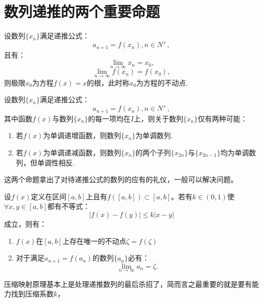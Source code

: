 \section{数列递推的两个重要命题}

\begin{proposition}[不动点的定义]
	设数列$\{x_n\}$满足递推公式：
	\begin{equation}
		a_{n+1}=f(x_n),n\in N^+,
	\end{equation}
	且有：
	\begin{equation}
		\displaystyle\lim_{n\to\infty}x_n=x_0,
	\end{equation}
	\begin{equation}
		\displaystyle\lim_{n\to\infty}f(x_n)=f(x_0),
	\end{equation}
	则极限$x_0$为方程$f(x)=x$的根，此时称$x_0$为方程的不动点.
\end{proposition}
	
	
\begin{proposition}[递推数列推出单调性]
	设数列$\{x_n\}$满足递推公式：
	\begin{equation}
		a_{n+1}=f(x_n),n\in N^+,
	\end{equation}
	其中函数$f(x)$与数列$\{x_n\}$的每一项均在$I$上，则关于数列$\{x_n\}$仅有两种可能：
	\begin{enumerate}
		\item 若$f(x)$为单调递增函数，则数列$\{x_n\}$为单调数列.
		\item 若$f(x)$为单调递减函数，则数列$\{x_n\}$的两个子列$\{x_{2n}\}$与$\{x_{2n-1}\}$均为单调数列，但单调性相反.
	\end{enumerate}
\end{proposition}

这两个命题拿出了对待递推公式的数列的应有的礼仪，一般可以解决问题。

\begin{proposition}[压缩映射原理]
	设$f(x)$定义在区间$[a,b]$上且有$f([a,b])\subset[a,b]$。若有$k\in(0,1)$使$\forall x,y\in[a,b]$都有不等式：
	\begin{equation}
		|f(x)-f(y)|\leq k|x-y|
	\end{equation} 
	成立，则有：
	\begin{enumerate}
		\item $f(x)$在$[a,b]$上存在唯一的不动点$\zeta=f(\zeta)$
		\item 对于满足$a_{n+1}=f(a_n)$的数列$\{a_n\}$必有：
		\begin{equation}
			\displaystyle\lim_{n\to\infty}a_n=\zeta.
		\end{equation}
	\end{enumerate}
\end{proposition}

压缩映射原理基本上是处理递推数列的最后杀招了，简而言之最重要的就是要有能力找到压缩系数$k$，
